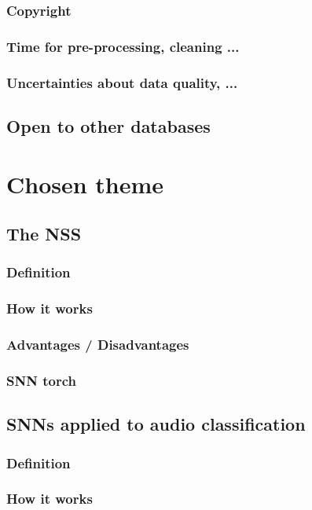 \documentclass{article}
\begin{document}
        \subsubsection{Copyright}
        \subsubsection{Time for pre-processing, cleaning ...}
        \subsubsection{Uncertainties about data quality, ...}
    \subsection{Open to other databases}

\section{Chosen theme}
    \subsection{The NSS}
        \subsubsection{Definition}
        \subsubsection{How it works}
        \subsubsection{Advantages / Disadvantages}
        \subsubsection{SNN torch}
    \subsection{SNNs applied to audio classification}
        \subsubsection{Definition}
        \subsubsection{How it works}
\end{document}
